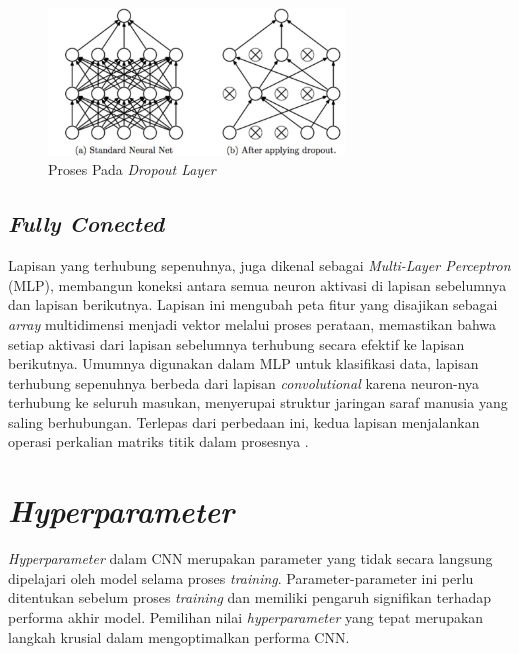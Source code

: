     \begin{figure}[H]
      \centering
      \includegraphics[width=0.70\textwidth]{figures/bab2/drop out.jpg}
      \caption{Proses Pada \textit{Dropout Layer} \cite{ida}}
      \label{Proses Pada Dropout Layer}
    
    \end{figure} 

    
\subsection{\textit{Fully Conected}}

    Lapisan yang terhubung sepenuhnya, juga dikenal sebagai \textit{Multi-Layer Perceptron} (MLP), membangun koneksi antara semua neuron aktivasi di lapisan sebelumnya dan lapisan berikutnya. Lapisan ini mengubah peta fitur yang disajikan sebagai \textit{array} multidimensi menjadi vektor melalui proses perataan, memastikan bahwa setiap aktivasi dari lapisan sebelumnya terhubung secara efektif ke lapisan berikutnya. Umumnya digunakan dalam MLP untuk klasifikasi data, lapisan terhubung sepenuhnya berbeda dari lapisan \textit{convolutional} karena neuron-nya terhubung ke seluruh masukan, menyerupai struktur jaringan saraf manusia yang saling berhubungan. Terlepas dari perbedaan ini, kedua lapisan menjalankan operasi perkalian matriks titik dalam prosesnya \cite{Dewi2018}.

    





\section{\textit{Hyperparameter}}

    \textit{Hyperparameter} dalam CNN merupakan parameter yang tidak secara langsung dipelajari oleh model selama proses \textit{training}. Parameter-parameter ini perlu ditentukan sebelum proses \textit{training} dan memiliki pengaruh signifikan terhadap performa akhir model. Pemilihan nilai \textit{hyperparameter} yang tepat merupakan langkah krusial dalam mengoptimalkan performa CNN.

